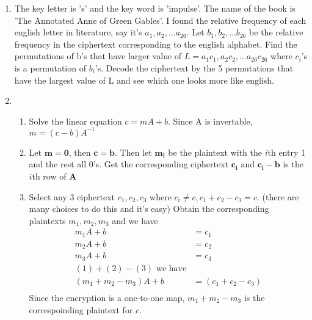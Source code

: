 \documentclass[12pt]{article}
\begin{document}

\begin{enumerate}
\item The key letter is 's' and the key word is 'impulse'. The name of the book is 'The Annotated Anne of Green Gables'. I found the relative frequency of each english letter in literature, say it's $a_1,a_2,\dots a_{26}$. Let $b_1,b_2,\dots b_{26}$ be the relative frequency in the ciphertext corresponding to the english alphabet. Find the permutations of b's that have larger value of $L=a_1c_1,a_2c_2,\dots a_{26}c_{26}$ where $c_i$'s is a permutation of $b_i$'s. Decode the ciphertext by the 5 permutations that have the largest value of L and see which one looks more like english.
\newpage

\item
\begin{enumerate}
\item
Solve the linear equation $c=mA+b$. Since A is invertable, $m=(c-b)A^{-1}$

\item
Let $\pmb{m}=\pmb{0}$, then $\pmb{c}=\pmb{b}$. Then let $\pmb{m_i}$ be the plaintext with the $i$th entry 1 and the rest all $0$'s. Get the corresponding ciphertext $\pmb{c_i}$ and $\pmb{c_i - b}$ is the $i$th row of $\pmb{A}$

\item
Select any 3 ciphertext $c_1,c_2,c_3$ where $c_i \neq c, c_1+c_2-c_3=c$. (there are many choices to do this and it's easy) Obtain the corresponding plaintexts $m_1,m_2,m_3$ and we have
\begin{align}
m_1A+b&=c_1\\
m_2A+b&=c_2\\
m_3A+b&=c_3\\
(1)+(2)-(3) \text{ we have}& \\
(m_1+m_2-m_3)A+b&=(c_1+c_2-c_3)\\
\end{align}
Since the encryption is a one-to-one map, $m_1+m_2-m_3$ is the correspoinding plaintext for $c$.
\end{enumerate}
\newpage


\end{enumerate}
\end{document}
